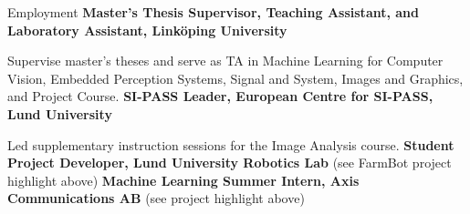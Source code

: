 \begin{rubric}{Employment}
%
	\textbf{Master's Thesis Supervisor, Teaching Assistant, and Laboratory Assistant, Linköping University}
	\par Supervise master's theses and serve as TA in Machine Learning for Computer Vision, Embedded Perception Systems, Signal and System, Images and Graphics, and Project Course.
%
	\textbf{SI-PASS Leader, European Centre for SI-PASS, Lund University}
	\par Led supplementary instruction sessions for the Image Analysis course.
%
	\textbf{Student Project Developer, Lund University Robotics Lab} (see FarmBot project highlight above)
%
	\textbf{Machine Learning Summer Intern, Axis Communications AB} (see project highlight above)
\end{rubric}